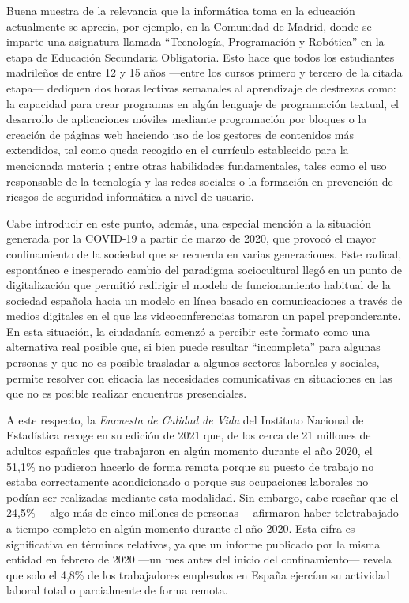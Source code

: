 Buena muestra de la relevancia que la informática toma en la educación actualmente se aprecia, por ejemplo, en la Comunidad de Madrid, donde se imparte una asignatura llamada ``Tecnología, Programación y Robótica'' en la etapa de Educación Secundaria Obligatoria. Esto hace que todos los estudiantes madrileños de entre 12 y 15 años ---entre los cursos primero y tercero de la citada etapa--- dediquen dos horas lectivas semanales al aprendizaje de destrezas como: la capacidad para crear programas en algún lenguaje de programación textual, el desarrollo de aplicaciones móviles mediante programación por bloques o la creación de páginas web haciendo uso de los gestores de contenidos más extendidos, tal como queda recogido en el currículo establecido para la mencionada materia \cite{CMEdu2015}; entre otras habilidades fundamentales, tales como el uso responsable de la tecnología y las redes sociales o la formación en prevención de riesgos de seguridad informática a nivel de usuario.

Cabe introducir en este punto, además, una especial mención a la situación generada por la COVID-19 a partir de marzo de 2020, que provocó el mayor confinamiento de la sociedad que se recuerda en varias generaciones. Este radical, espontáneo e inesperado cambio del paradigma sociocultural llegó en un punto de digitalización que permitió redirigir el modelo de funcionamiento habitual de la sociedad española hacia un modelo en línea basado en comunicaciones a través de medios digitales en el que las videoconferencias tomaron un papel preponderante. En esta situación, la ciudadanía comenzó a percibir este formato como una alternativa real posible que, si bien puede resultar ``incompleta'' para algunas personas y que no es posible trasladar a algunos sectores laborales y sociales, permite resolver con eficacia las necesidades comunicativas en situaciones en las que no es posible realizar encuentros presenciales.

A este respecto, la \textit{Encuesta de Calidad de Vida} del Instituto Nacional de Estadística recoge en su edición de 2021 \cite{INECOVID_Teletrabajo2020} que, de los cerca de 21 millones de adultos españoles que trabajaron en algún momento durante el año 2020, el 51,1\% no pudieron hacerlo de forma remota porque su puesto de trabajo no estaba correctamente acondicionado o porque sus ocupaciones laborales no podían ser realizadas mediante esta modalidad. Sin embargo, cabe reseñar que el 24,5\% ---algo más de cinco millones de personas--- afirmaron haber teletrabajado a tiempo completo en algún momento durante el año 2020. Esta cifra es significativa en términos relativos, ya que un informe publicado por la misma entidad en febrero de 2020 ---un mes antes del inicio del confinamiento--- \cite{INECOVID_TeletrabajoFeb2020} revela que solo el 4,8\% de los trabajadores empleados en España ejercían su actividad laboral total o parcialmente de forma remota.

